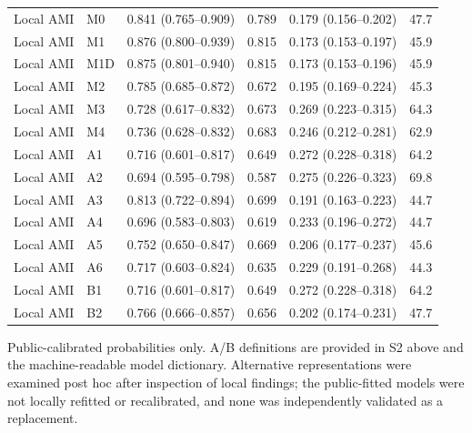 \documentclass[pdflatex,sn-vancouver-num]{sn-jnl}
\begin{document}
\begin{longtable}{llrrrr}
Local AMI & M0 & 0.841 (0.765--0.909) & 0.789 & 0.179 (0.156--0.202) & 47.7\\
Local AMI & M1 & 0.876 (0.800--0.939) & 0.815 & 0.173 (0.153--0.197) & 45.9\\
Local AMI & M1D & 0.875 (0.801--0.940) & 0.815 & 0.173 (0.153--0.196) & 45.9\\
Local AMI & M2 & 0.785 (0.685--0.872) & 0.672 & 0.195 (0.169--0.224) & 45.3\\
Local AMI & M3 & 0.728 (0.617--0.832) & 0.673 & 0.269 (0.223--0.315) & 64.3\\
Local AMI & M4 & 0.736 (0.628--0.832) & 0.683 & 0.246 (0.212--0.281) & 62.9\\
Local AMI & A1 & 0.716 (0.601--0.817) & 0.649 & 0.272 (0.228--0.318) & 64.2\\
Local AMI & A2 & 0.694 (0.595--0.798) & 0.587 & 0.275 (0.226--0.323) & 69.8\\
Local AMI & A3 & 0.813 (0.722--0.894) & 0.699 & 0.191 (0.163--0.223) & 44.7\\
Local AMI & A4 & 0.696 (0.583--0.803) & 0.619 & 0.233 (0.196--0.272) & 44.7\\
Local AMI & A5 & 0.752 (0.650--0.847) & 0.669 & 0.206 (0.177--0.237) & 45.6\\
Local AMI & A6 & 0.717 (0.603--0.824) & 0.635 & 0.229 (0.191--0.268) & 44.3\\
Local AMI & B1 & 0.716 (0.601--0.817) & 0.649 & 0.272 (0.228--0.318) & 64.2\\
Local AMI & B2 & 0.766 (0.666--0.857) & 0.656 & 0.202 (0.174--0.231) & 47.7\\
\end{longtable}
\noindent Public-calibrated probabilities only. A/B definitions are provided in S2 above and the machine-readable model dictionary. Alternative representations were examined post hoc after inspection of local findings; the public-fitted models were not locally refitted or recalibrated, and none was independently validated as a replacement.\par\endgroup
\end{document}
